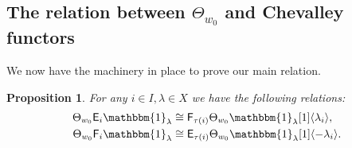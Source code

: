 \documentclass[11pt,reqno]{amsart}
\numberwithin{equation}{section}
\newtheorem{Proposition}[equation]{Proposition}
\theoremstyle{definition}
\theoremstyle{named}
\newcommand{\sE}{\mathsf{E}}
\newcommand{\sF}{\mathsf{F}}
\newcommand{\bone}{\mathbbm{1}}
\begin{document}
\subsection{The relation between $\Theta_{w_0}$ and Chevalley functors}

We now have the machinery in place to prove our main relation.  

\begin{Proposition}\label{prop:mainrel}
For any $i\in I, \lambda \in X$ we have the following relations:
\begin{align*}
\Theta_{w_0}\sE_i\bone_\lambda &\cong \sF_{\tau(i)}\Theta_{w_0}\bone_\lambda[1]\langle \lambda_i \rangle, %
\\
\Theta_{w_0}\sF_i\bone_\lambda &\cong \sE_{\tau(i)}\Theta_{w_0}\bone_\lambda[1]\langle -\lambda_i \rangle. %
\end{align*}
\end{Proposition}
\end{document}
